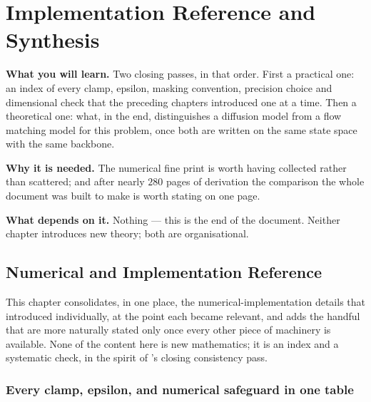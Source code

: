 \documentclass[11pt,a4paper]{report}
\theoremstyle{definition}
\theoremstyle{remark}
\begin{document}
\part{Implementation Reference and Synthesis}
\label{part:synthesis}


\begin{tcolorbox}[colback=gray!4,colframe=gray!55!black,
  title=Part VIII at a glance, fonttitle=\bfseries, breakable]
\textbf{What you will learn.} Two closing passes, in that order. First a practical one: an index of every clamp, epsilon, masking convention, precision choice and dimensional check that the preceding chapters introduced one at a time. Then a theoretical one: what, in the end, distinguishes a diffusion model from a flow matching model for this problem, once both are written on the same state space with the same backbone.

\textbf{Why it is needed.} The numerical fine print is worth having collected rather than scattered; and after nearly $280$ pages of derivation the comparison the whole document was built to make is worth stating on one page.

\textbf{What depends on it.} Nothing --- this is the end of the document. Neither chapter introduces new theory; both are organisational.
\end{tcolorbox}


\chapter{Numerical and Implementation Reference}
\label{chap:numerics}

This chapter consolidates, in one place, the numerical-implementation
details that 
introduced individually, at the point each became relevant, and adds the
handful that are more naturally stated only once every other piece of
machinery is available. None of the content here is new mathematics; it is
an index and a systematic check, in the spirit of
's closing consistency pass.

\section{Every clamp, epsilon, and numerical safeguard in one table}
\label{sec:clamp-table}
\end{document}
